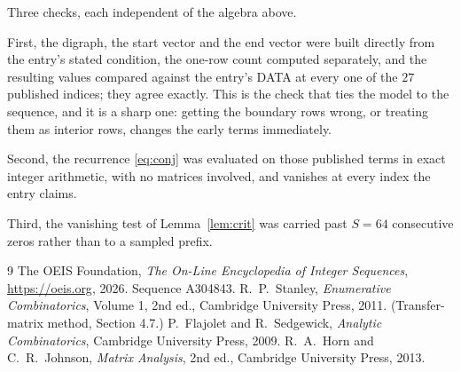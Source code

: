 \documentclass[11pt,a4paper]{article}
\theoremstyle{plain}
\theoremstyle{definition}
\begin{document}
Three checks, each independent of the algebra above.

First, the digraph, the start vector and the end vector were built directly from the
entry's stated condition, the one-row count computed separately, and the resulting values
compared against the entry's DATA at every one of the $27$ published indices; they
agree exactly. This is the check that ties the model to the sequence, and it is a sharp one:
getting the boundary rows wrong, or treating them as interior rows, changes the early terms
immediately.

Second, the recurrence \eqref{eq:conj} was evaluated on those published terms in exact
integer arithmetic, with no matrices involved, and vanishes at every index the entry claims.

Third, the vanishing test of Lemma~\ref{lem:crit} was carried past $S=64$ consecutive
zeros rather than to a sampled prefix.

\begin{thebibliography}{9}
 The OEIS Foundation, \emph{The On-Line Encyclopedia of Integer
Sequences}, \url{https://oeis.org}, 2026. Sequence A304843.
 R.~P.~Stanley, \emph{Enumerative Combinatorics}, Volume 1, 2nd ed.,
Cambridge University Press, 2011. (Transfer-matrix method, Section 4.7.)
 P.~Flajolet and R.~Sedgewick, \emph{Analytic Combinatorics}, Cambridge
University Press, 2009.
 R.~A.~Horn and C.~R.~Johnson, \emph{Matrix Analysis}, 2nd ed., Cambridge
University Press, 2013.
\end{thebibliography}
\end{document}
